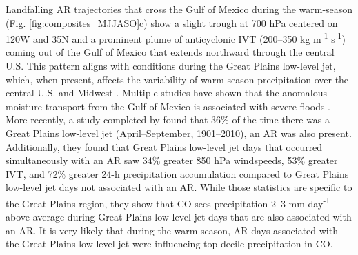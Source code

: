 \documentclass[draft]{agujournal2019}
\begin{document}
Landfalling AR trajectories that cross the Gulf of Mexico during the warm-season (Fig. \ref{fig:composites_MJJASO}c) show a slight trough at 700 hPa centered on 120\textdegree W and 35\textdegree N and a prominent plume of anticyclonic IVT (200--350 kg m\textsuperscript{-1} s\textsuperscript{-1}) coming out of the Gulf of Mexico that extends northward through the central U.S. This pattern aligns with conditions during the Great Plains low-level jet, which, when present, affects the variability of warm-season precipitation over the central U.S. and Midwest \cite{Pu2016DynamicalPrecipitation, Helfand1995ClimatologyStates, Weaver2008VariabilityImpacts, Schubert1998SubseasonalStates}. Multiple studies have shown that the anomalous moisture transport from the Gulf of Mexico is associated with severe floods \cite{Mo1997AtmosphericStates, Weaver2009PentadBalance}. More recently, a study completed by  found that 36\% of the time there was a Great Plains low-level jet (April--September, 1901--2010), an AR was also present. Additionally, they found that Great Plains low-level jet days that occurred simultaneously with an AR saw 34\% greater 850 hPa windspeeds, 53\% greater IVT, and
72\% greater 24-h precipitation accumulation compared to Great Plains low-level jet days not associated with an AR. While those statistics are specific to the Great Plains region, they show that CO sees precipitation 2--3 mm day\textsuperscript{-1} above average during Great Plains low-level jet days that are also associated with an AR. It is very likely that during the warm-season, AR days associated with the Great Plains low-level jet were influencing top-decile precipitation in CO. 
\end{document}
